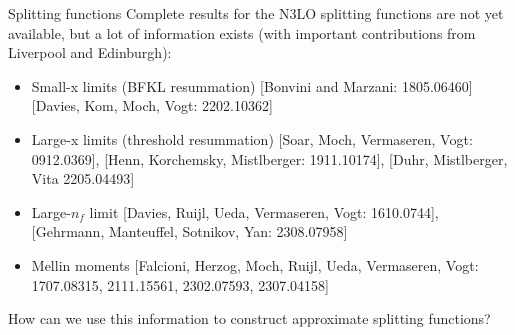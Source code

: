\documentclass[8pt,t]{beamer}
\begin{document}
\begin{frame}{Splitting functions}
  Complete results for the N3LO splitting functions are not yet available, but a lot of information exists (with important contributions from Liverpool and Edinburgh):
  \begin{itemize}
    \item Small-x limits (BFKL resummation) {\color{gray}\small [Bonvini and Marzani: 1805.06460] [Davies, Kom, Moch, Vogt: 2202.10362]}
    \item Large-x limits (threshold resummation) {\color{gray}\small [Soar, Moch, Vermaseren, Vogt: 0912.0369], [Henn, Korchemsky, Mistlberger: 1911.10174], [Duhr, Mistlberger, Vita 2205.04493]}
    \item Large-$n_f$ limit {\color{gray}\small [Davies, Ruijl, Ueda, Vermaseren, Vogt: 1610.0744], [Gehrmann, Manteuffel, Sotnikov, Yan: 2308.07958]}
    \item Mellin moments
    {\color{gray}\small [Falcioni, Herzog, Moch, Ruijl, Ueda, Vermaseren, Vogt: 1707.08315, 2111.15561, 2302.07593, 2307.04158]}
  \end{itemize}

  \vspace*{2em}
  \begin{center}
    How can we use this information to construct approximate splitting functions?
  \end{center}

\end{frame}
\end{document}

